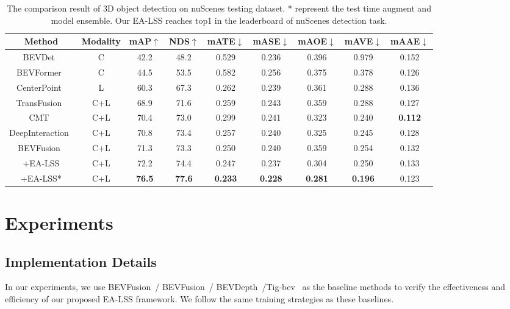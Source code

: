 \documentclass[letterpaper]{article} \usepackage[submission]{aaai24}  \usepackage{times}  \usepackage{helvet}  \usepackage{courier}  \usepackage[hyphens]{url}  \usepackage{graphicx} \urlstyle{rm} \def\UrlFont{\rm}  \usepackage{natbib}  \usepackage{caption} \frenchspacing  \setlength{\pdfpagewidth}{8.5in} \setlength{\pdfpageheight}{11in} \usepackage{algorithm}
\begin{document}
\begin{table*}
\begin{center}
\small
\begin{tabular}{c|c|cc|ccccc}
\hline
Method & Modality & mAP$\uparrow$  & NDS$\uparrow$ & mATE$\downarrow$ & mASE$\downarrow$ & mAOE$\downarrow$ & mAVE$\downarrow$ & mAAE$\downarrow$ \\
\hline
BEVDet~\cite{huang2021bevdet} & C &  42.2  & 48.2 & 0.529&0.236&0.396&0.979&0.152  \\
BEVFormer~\cite{li2022bevformer} & C &44.5&53.5& 0.582& 0.256& 0.375& 0.378 & 0.126 \\
CenterPoint~\cite{yin2021centerpoint} & L &60.3& 67.3& 0.262 & 0.239 & 0.361 & 0.288& 0.136 \\
TransFusion~\cite{bai2022transfusion} & C+L &68.9& 71.6& 0.259 & 0.243 & 0.359 & 0.288& 0.127 \\
CMT~\cite{yan2023cmt}  & C+L &70.4& 73.0& 0.299 & 0.241 & 0.323 & 0.240& \textbf{0.112} \\
DeepInteraction~\cite{yang2022deepinteraction}  & C+L & 70.8 & 73.4 & 0.257 & 0.240 & 0.325 & 0.245 & 0.128 \\
\hline
BEVFusion~\cite{liang2022bevfusion} & C+L &	71.3  & 73.3 & 0.250& 0.240& 0.359& 0.254& 0.132 \\
+EA-LSS  & C+L & 72.2& 74.4& 0.247&0.237& 0.304& 0.250 & 0.133 \\	
+EA-LSS*  & C+L & \textbf{76.5} &  \textbf{77.6} & \textbf{0.233} & \textbf{0.228} & \textbf{0.281} & \textbf{0.196} & 0.123\\	
\hline
\end{tabular}
\end{center}
\caption{The comparison result of 3D object detection on nuScenes testing dataset. * represent the test time augment and model ensemble. Our EA-LSS reaches top1 in the leaderboard of nuScenes detection task.}
\label{table:detection_test}
\end{table*}



\section{Experiments}
\subsection{Implementation Details}
In our experiments, we use BEVFusion~\cite{liu2022bevfusion}/ BEVFusion~\cite{liang2022bevfusion}/ BEVDepth~\cite{li2022bevdepth}/Tig-bev~\cite{huang2022tigbev} as the baseline methods to verify the effectiveness and efficiency of our proposed EA-LSS framework. We follow the same training strategies as these baselines.
\end{document}
